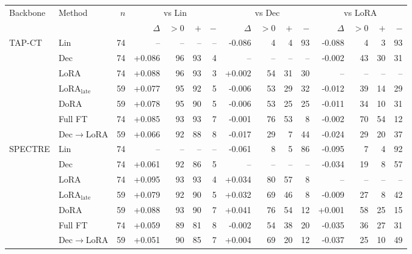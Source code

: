 \setlength{\tabcolsep}{3.5pt}
\begin{tabular}{@{}llrrrrrrrrrrrrr@{}}
\toprule
Backbone & Method & $n$ & \multicolumn{4}{c}{vs Lin} & \multicolumn{4}{c}{vs Dec} & \multicolumn{4}{c}{vs LoRA} \\
\cmidrule(lr){4-7}\cmidrule(lr){8-11}\cmidrule(lr){12-15}
 & & & $\Delta$ & $>0$ & $+$ & $-$ & $\Delta$ & $>0$ & $+$ & $-$ & $\Delta$ & $>0$ & $+$ & $-$ \\
\midrule
TAP-CT & Lin & 74 & -- & -- & -- & -- & -0.086 & 4 & 4 & 93 & -0.088 & 4 & 3 & 93 \\
 & Dec & 74 & +0.086 & 96 & 93 & 4 & -- & -- & -- & -- & -0.002 & 43 & 30 & 31 \\
 & LoRA & 74 & +0.088 & 96 & 93 & 3 & +0.002 & 54 & 31 & 30 & -- & -- & -- & -- \\
 & LoRA$_{\text{late}}$ & 59 & +0.077 & 95 & 92 & 5 & -0.006 & 53 & 29 & 32 & -0.012 & 39 & 14 & 29 \\
 & DoRA & 59 & +0.078 & 95 & 90 & 5 & -0.006 & 53 & 25 & 25 & -0.011 & 34 & 10 & 31 \\
 & Full FT & 74 & +0.085 & 93 & 93 & 7 & -0.001 & 76 & 53 & 8 & -0.002 & 70 & 54 & 12 \\
 & Dec$\to$LoRA & 59 & +0.066 & 92 & 88 & 8 & -0.017 & 29 & 7 & 44 & -0.024 & 29 & 20 & 37 \\
\addlinespace
SPECTRE & Lin & 74 & -- & -- & -- & -- & -0.061 & 8 & 5 & 86 & -0.095 & 7 & 4 & 92 \\
 & Dec & 74 & +0.061 & 92 & 86 & 5 & -- & -- & -- & -- & -0.034 & 19 & 8 & 57 \\
 & LoRA & 74 & +0.095 & 93 & 93 & 4 & +0.034 & 80 & 57 & 8 & -- & -- & -- & -- \\
 & LoRA$_{\text{late}}$ & 59 & +0.079 & 92 & 90 & 5 & +0.032 & 69 & 46 & 8 & -0.009 & 27 & 8 & 42 \\
 & DoRA & 59 & +0.088 & 93 & 90 & 7 & +0.041 & 76 & 54 & 12 & +0.001 & 58 & 25 & 15 \\
 & Full FT & 74 & +0.059 & 89 & 81 & 8 & -0.002 & 54 & 38 & 20 & -0.035 & 36 & 27 & 31 \\
 & Dec$\to$LoRA & 59 & +0.051 & 90 & 85 & 7 & +0.004 & 69 & 20 & 12 & -0.037 & 25 & 10 & 49 \\
\bottomrule
\end{tabular}
